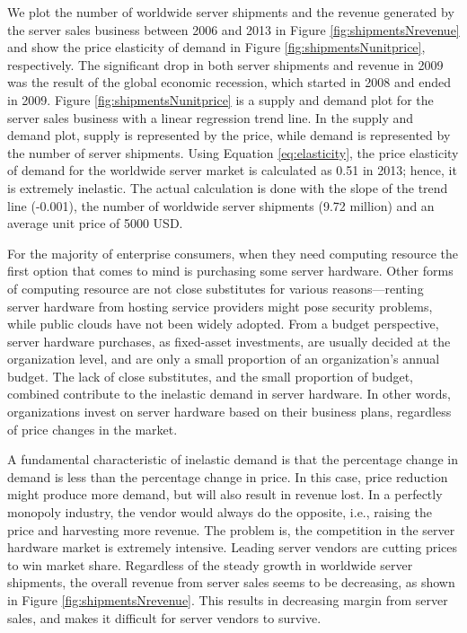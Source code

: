 \documentclass[10pt,journal,cspaper,compsoc]{IEEEtran}
\begin{document}
We plot the number of worldwide server shipments and the revenue generated by the server sales business between 2006 and 2013 in Figure \ref{fig:shipmentsNrevenue} and show the price elasticity of demand in Figure \ref{fig:shipmentsNunitprice}, respectively.
The significant drop in both server shipments and revenue in 2009 was the result of the global economic recession, which started in 2008 and ended in 2009. 
Figure \ref{fig:shipmentsNunitprice} is a supply and demand plot for the server sales business with a linear regression trend line. In the  supply and demand plot, supply is represented by the price, while demand is represented by the number of server shipments. %
Using Equation \ref{eq:elasticity}, the price elasticity of demand for the worldwide server market is calculated as 0.51 in 2013; hence, it is extremely inelastic. The actual calculation is done with the slope of the trend line (-0.001), the number of worldwide server shipments (9.72 million) and an average unit price of 5000 USD.

For the majority of enterprise consumers, when they need computing resource the first option that comes to mind is purchasing some server hardware. Other forms of computing resource are not close substitutes for various reasons---renting server hardware from hosting service providers might pose security problems, while public clouds have not been widely adopted. From a budget perspective, server hardware purchases, as fixed-asset investments, are usually decided at the organization level, and are only a small proportion of an organization's annual budget. The lack of close substitutes, and the small proportion of budget, combined contribute to the inelastic demand in server hardware. In other words, organizations invest on server hardware based on their business plans, regardless of price changes in the market. 

A fundamental characteristic of inelastic demand is that the percentage change in demand is less than the percentage change in price. In this case, price reduction might produce more demand, but will also result in revenue lost. In a perfectly monopoly industry, the vendor would always do the opposite, i.e., raising the price and harvesting more revenue. The problem is, the competition in the server hardware market is extremely intensive. Leading server vendors are cutting prices to win market share. Regardless of the steady growth in worldwide server shipments, the overall revenue from server sales seems to be decreasing, as shown in Figure \ref{fig:shipmentsNrevenue}. This results in decreasing margin from server sales, and makes it difficult for server vendors to survive. 
\end{document}
